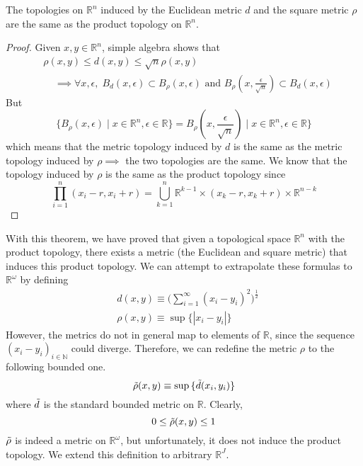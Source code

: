   \begin{theorem}
    The topologies on $\mathbb{R}^n$ induced by the Euclidean metric $d$ and the square metric $\rho$ are the same as the product topology on $\mathbb{R}^n$. 
  \end{theorem}
  \begin{proof}
    Given $x, y \in \mathbb{R}^n$, simple algebra shows that 
    \begin{align*}
      & \rho(x, y) \leq d(x, y) \leq \sqrt{n} \rho(x, y) \\
      & \;\;\;\; \implies \forall x, \epsilon, \; B_d (x, \epsilon) \subset B_\rho (x, \epsilon) \text{ and } B_\rho (x, \frac{\epsilon}{\sqrt{n}}) \subset B_d (x, \epsilon)
    \end{align*}
    But
    \begin{equation}
      \{ B_\rho (x, \epsilon) \mid x \in \mathbb{R}^n, \epsilon \in \mathbb{R}\} = B_\rho (x, \frac{\epsilon}{\sqrt{n}}) \mid x \in \mathbb{R}^n, \epsilon \in \mathbb{R}\}
    \end{equation}
    which means that the metric topology induced by $d$ is the same as the metric topology induced by $\rho \implies$ the two topologies are the same. We know that the topology induced by $\rho$ is the same as the product topology since 
    \begin{equation}
      \prod_{i=1}^n (x_i - r, x_i + r) = \bigcup_{k=1}^n \mathbb{R}^{k-1} \times (x_k - r, x_k + r) \times \mathbb{R}^{n-k}
    \end{equation}
  \end{proof}

  With this theorem, we have proved that given a topological space $\mathbb{R}^n$ with the product topology, there exists a metric (the Euclidean and square metric) that induces this product topology. We can attempt to extrapolate these formulas to $\mathbb{R}^\omega$ by defining
  \begin{align*}
    & d(x, y) \equiv \bigg(\sum_{i=1}^\infty (x_i - y_i)^2 \bigg)^{\frac{1}{2}} \\
    & \rho(x, y) \equiv \sup{\{|x_i - y_i|\}}
  \end{align*}
  However, the metrics do not in general map to elements of $\mathbb{R}$, since the sequence $(x_i - y_i)_{i \in \mathbb{N}}$ could diverge. Therefore, we can redefine the metric $\rho$ to the following bounded one. 
  \begin{equation}
    \Tilde{\rho} (x, y) \equiv \sup{\{\Tilde{d}(x_i, y_i)\}}
  \end{equation}
  where $\Tilde{d}$ is the standard bounded metric on $\mathbb{R}$. Clearly,
  \begin{equation}
    0 \leq \Tilde{\rho}(x, y) \leq 1
  \end{equation}
  $\Tilde{\rho}$ is indeed a metric on $\mathbb{R}^\omega$, but unfortunately, it does not induce the product topology. We extend this definition to arbitrary $\mathbb{R}^J$. 
  
